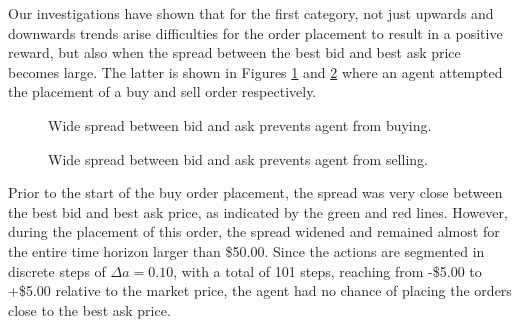 Our investigations have shown that for the first category, not just upwards and downwards trends arise difficulties for the order placement to result in a positive reward, but also when the spread between the best bid and best ask price becomes large.
The latter is shown in Figures \ref{fig:analysis-limit-wide-spread-buy} and \ref{fig:analysis-limit-wide-spread-sell} where an agent attempted the placement of a buy and sell order respectively.
\begin{figure}[H]
    \centering
    \caption{Wide spread between bid and ask prevents agent from buying.}
    \label{fig:analysis-limit-wide-spread-buy}
\end{figure}
\begin{figure}[H]
    \centering
    \caption{Wide spread between bid and ask prevents agent from selling.}
    \label{fig:analysis-limit-wide-spread-sell}
\end{figure}
Prior to the start of the buy order placement, the spread was very close between the best bid and best ask price, as indicated by the green and red lines.
However, during the placement of this order, the spread widened and remained almost for the entire time horizon larger than \$50.00.
Since the actions are segmented in discrete steps of $\Delta{a}=0.10$, with a total of 101 steps, reaching from -\$5.00 to +\$5.00 relative to the market price, the agent had no chance of placing the orders close to the best ask price.
